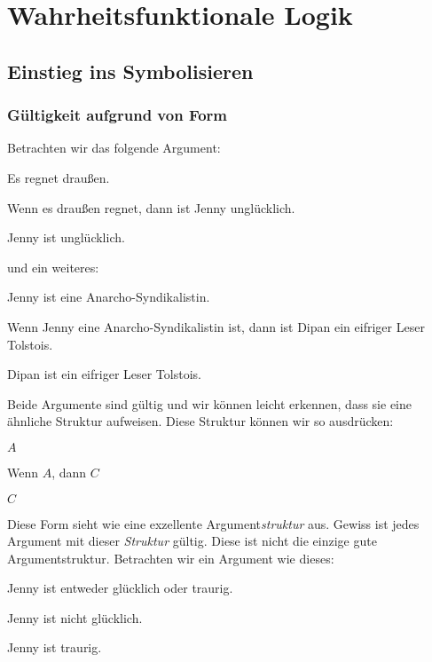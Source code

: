 
\part{Wahrheitsfunktionale Logik}
\label{ch.TFL}

\chapter{Einstieg ins Symbolisieren}

\section{Gültigkeit aufgrund von Form}\label{s:ValidityInVirtueOfForm}
Betrachten wir das folgende Argument:
	\begin{earg}
		\item[] Es regnet drau{\ss}en.
		\item[] Wenn es drau{\ss}en regnet, dann ist Jenny unglücklich.
		\item[\therefore] Jenny ist unglücklich.
	\end{earg}
und ein weiteres:
	\begin{earg}
		\item[] Jenny ist eine Anarcho-Syndikalistin.
		\item[] Wenn Jenny eine Anarcho-Syndikalistin ist, dann ist Dipan ein eifriger Leser Tolstois. 
		\item[\therefore] Dipan ist ein eifriger Leser Tolstois.
	\end{earg}
Beide Argumente sind gültig und wir können leicht erkennen, dass sie eine ähnliche Struktur aufweisen. Diese Struktur können wir so ausdrücken:
	\begin{earg}
		\item[] $A$
		\item[] Wenn $A$, dann $C$
		\item[\therefore] $C$
	\end{earg}
Diese Form sieht wie eine exzellente Argument\emph{struktur} aus. Gewiss ist jedes Argument mit dieser \emph{Struktur} gültig. Diese ist nicht die einzige gute Argumentstruktur. Betrachten wir ein Argument wie dieses: %
	\begin{earg}
		\item[] Jenny ist entweder glücklich oder traurig.
		\item[] Jenny ist nicht glücklich.
		\item[\therefore] Jenny ist traurig.
	\end{earg}
